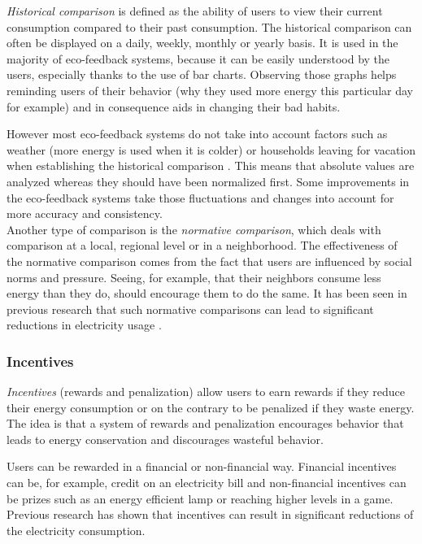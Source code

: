 \documentclass[journal]{vgtc}                %
\begin{document}
\textit{Historical comparison} is defined as the ability of users to view their current consumption compared to their past consumption. %
The historical comparison can often be displayed on a daily, weekly, monthly or yearly basis. It is used in the majority of eco-feedback systems\cite{spagnolli2011eco}, because it can be easily understood by the users, especially thanks to the use of bar charts. %
Observing those graphs helps reminding users of their behavior (why they used more energy this particular day for example) and in consequence aids in changing their bad habits.

However most eco-feedback systems do not take into account factors such as weather (more energy is used when it is colder) or households leaving for vacation when establishing the historical comparison \cite{karjalainen2011consumer}. This means that absolute values are analyzed whereas they should have been normalized first. Some improvements in the eco-feedback systems take those fluctuations and changes into account for more accuracy and consistency. \\

Another type of comparison is the \textit{normative comparison}, which deals with comparison at a local, regional level or in a neighborhood. The effectiveness of the normative comparison comes from the fact that users are influenced by social norms and pressure. Seeing, for example, that their neighbors consume less energy than they do, should encourage them to do the same. It has been seen in previous research that such normative comparisons can lead to significant reductions in electricity usage \cite{peschiera2010response,siero1996changing,iyer2006comparison}.


\subsubsection{Incentives}
\textit{Incentives} (rewards and penalization) allow users to earn rewards if they reduce their energy consumption or on the contrary to be penalized if they waste energy. The idea is that a system of rewards and penalization encourages behavior that leads to energy conservation and discourages wasteful behavior.

Users can be rewarded in a financial or non-financial way. Financial incentives can be, for example, credit on an electricity bill and non-financial incentives can be prizes such as an energy efficient lamp or reaching higher levels in a game.
Previous research \cite{petersen2007dormitory} has shown that incentives can result in significant reductions of the electricity consumption.
\end{document}
